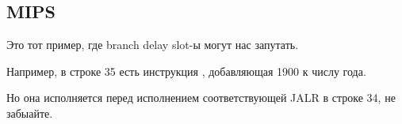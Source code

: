 \subsection{MIPS}



Это тот пример, где branch delay slot-ы могут нас запутать.

Например, в строке 35 есть инструкция , добавляющая 1900 к числу года.

Но она исполняется перед исполнением соответствующей JALR в строке 34, не забыайте.

